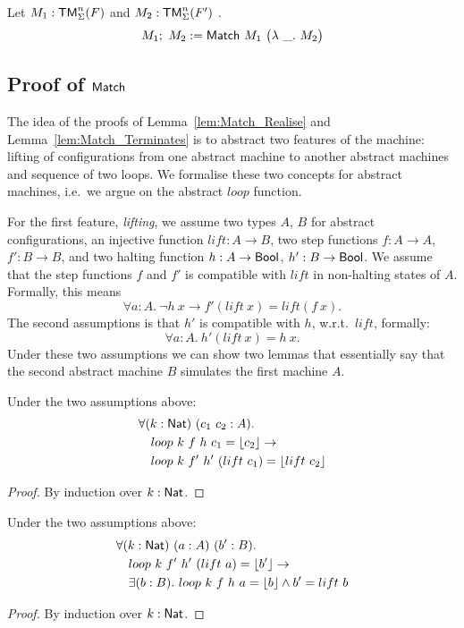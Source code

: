 \begin{definition}
  Let $M_1 : \textsf{TM}_\Sigma^n(F)$ and $M_2 : \textsf{TM}_\Sigma^n(F')$ .
  \[
    M_1 ;~ M_2 := \textsf{Match}~M_1~
    \bigl(
    \lambda~\_.~M_2
    \bigr)
  \]
\end{definition}


\subsection{Proof of $\textsf{Match}$}
\label{sec:match-proofs}


The idea of the proofs of Lemma~\ref{lem:Match_Realise} and Lemma~\ref{lem:Match_Terminates} is to abstract two features of the machine: lifting of
configurations from one abstract machine to another abstract machines and sequence of two loops.  We formalise these two concepts for abstract
machines, i.e.\ we argue on the abstract $loop$ function.

For the first feature, \emph{lifting}, we assume two types $A$, $B$ for abstract configurations, an injective function $lift : A \to B$, two step
functions $f : A \to A$, $f' : B \to B$, and two halting function $h : A \rightarrow \textsf{Bool}$, $h' : B \rightarrow \textsf{Bool}$.  We assume that the step functions $f$ and
$f'$ is compatible with $lift$ in non-halting states of $A$.  Formally, this means
\[ \forall a:A.~\lnot h~x \rightarrow f' (lift~x) = lift (f~x). \]
The second assumptions is that $h'$ is compatible with $h$, w.r.t.\ $lift$, formally:
\[ \forall a:A.~h'(lift~x)=h~x. \]
Under these two assumptions we can show two lemmas that essentially say that the second abstract machine $B$ simulates the first machine $A$.
\begin{lemma}
  \label{lem:loop_lift}
  Under the two assumptions above:
  \begin{alignat*}{1}
    & \forall (k:\textsf{Nat})~(c_1~c_2 : A). \\
    & \quad loop~k~f ~h ~c_1 = \left\lfloor {c_2} \right\rfloor \rightarrow \\
    & \quad loop~k~f'~h'~(lift~c_1) = \left\lfloor {lift~c_2} \right\rfloor
  \end{alignat*}
\end{lemma}
\begin{proof}
  By induction over $k:\textsf{Nat}$.
\end{proof}
\begin{lemma}
  \label{lem:loop_unlift}
  Under the two assumptions above:
  \begin{alignat*}{1}
    & \forall (k:\textsf{Nat})~(a:A)~(b':B). \\
    & \quad loop~k~f'~h'~(lift~a) = \left\lfloor {b'} \right\rfloor \rightarrow \\
    & \quad \exists (b:B).~loop~k~f~h~a = \left\lfloor {b} \right\rfloor \land b'=lift~b
  \end{alignat*}
\end{lemma}
\begin{proof}
  By induction over $k:\textsf{Nat}$.
\end{proof}

